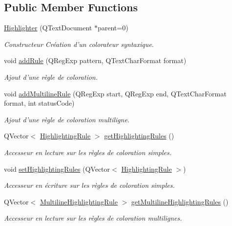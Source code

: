 \subsection*{Public Member Functions}
\begin{DoxyCompactItemize}
\item 
\hyperlink{class_highlighter_af9fa54a58a9365e91e5f8eccf22f5153}{Highlighter} (QTextDocument $\ast$parent=0)
\begin{DoxyCompactList}\small\item\em Constructeur Création d'un colorateur syntaxique. \item\end{DoxyCompactList}\item 
void \hyperlink{class_highlighter_a6eeef92305a408e5f05083cfdc53f7ff}{addRule} (QRegExp pattern, QTextCharFormat format)
\begin{DoxyCompactList}\small\item\em Ajout d'une règle de coloration. \item\end{DoxyCompactList}\item 
void \hyperlink{class_highlighter_ac937870869e3bf10ba5bb942741e77b8}{addMultilineRule} (QRegExp start, QRegExp end, QTextCharFormat format, int statusCode)
\begin{DoxyCompactList}\small\item\em Ajout d'une règle de coloration multiligne. \item\end{DoxyCompactList}\item 
QVector$<$ \hyperlink{struct_highlighting_rule}{HighlightingRule} $>$ \hyperlink{class_highlighter_ad27060bc0ef9f5a8cf1d1af69f8123e2}{getHighlightingRules} ()
\begin{DoxyCompactList}\small\item\em Accesseur en lecture sur les règles de coloration simples. \item\end{DoxyCompactList}\item 
void \hyperlink{class_highlighter_af5d284383a3bd670621cf742697d892b}{setHighlightingRules} (QVector$<$ \hyperlink{struct_highlighting_rule}{HighlightingRule} $>$)
\begin{DoxyCompactList}\small\item\em Accesseur en écriture sur les règles de coloration simples. \item\end{DoxyCompactList}\item 
QVector$<$ \hyperlink{struct_multiline_highlighting_rule}{MultilineHighlightingRule} $>$ \hyperlink{class_highlighter_a4086e6e2db0e7e7a596f5b7b6d08ffdf}{getMultilineHighlightingRules} ()
\begin{DoxyCompactList}\small\item\em Accesseur en lecture sur les règles de coloration multilignes. \item\end{DoxyCompactList}\end{DoxyCompactItemize}
